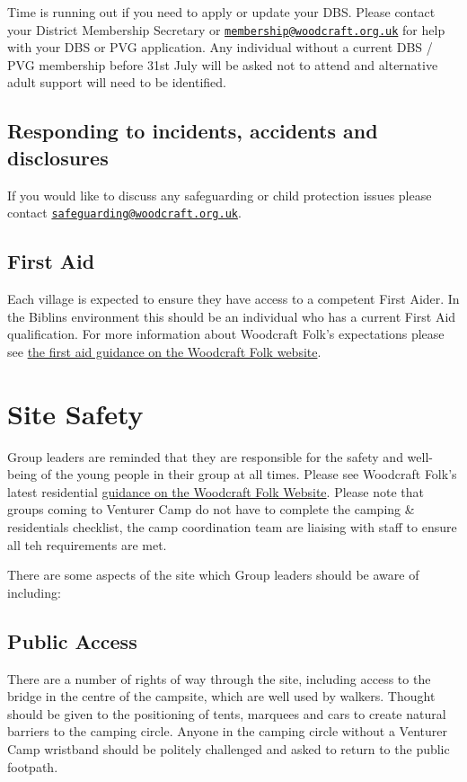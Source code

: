 \documentclass[a4paper, 11pt]{report}
\newcommand{\nl}{\newline}
\begin{document}
Time is running out if you need to apply or update your DBS. Please contact your District Membership Secretary or \href{mailto:membership@woodcraft.org.uk}{\texttt{membership@woodcraft.org.uk}} for help with your DBS or PVG application. Any individual without a current DBS / PVG membership before 31st July will be asked not to attend and alternative adult support will need to be identified.

\section{Responding to incidents, accidents and disclosures}
If you would like to discuss any safeguarding or child protection issues please contact \href{mailto:safeguarding@woodcraft.org.uk}{\texttt{safeguarding@woodcraft.org.uk}}.

\section{First Aid}
Each village is expected to ensure they have access to a competent First Aider. In the Biblins environment this should be an individual who has a current First Aid qualification. For more information about Woodcraft Folk's expectations please see \href{https://woodcraft.org.uk/resources/first-aid-guidance/}{the first aid guidance on the Woodcraft Folk website}.

\chapter{Site Safety}
Group leaders are reminded that they are responsible for the safety and well-being of the young people in their group at all times. Please see Woodcraft Folk's latest residential \href{https://woodcraft.org.uk/group-guidance/camping-and-residentials/}{guidance on the Woodcraft Folk Website}. Please note that groups coming to Venturer Camp do not have to complete the camping \& residentials checklist, the camp coordination team are liaising with staff to ensure all teh requirements are met. \nl

There are some aspects of the site which Group leaders should be aware of including:
\section{Public Access}
There are a number of rights of way through the site, including access to the bridge in the centre of the campsite, which are well used by walkers. Thought should be given to the positioning of tents, marquees and cars to create natural barriers to the camping circle. Anyone in the camping circle without a Venturer Camp wristband should be politely challenged and asked to return to the public footpath.
\end{document}
